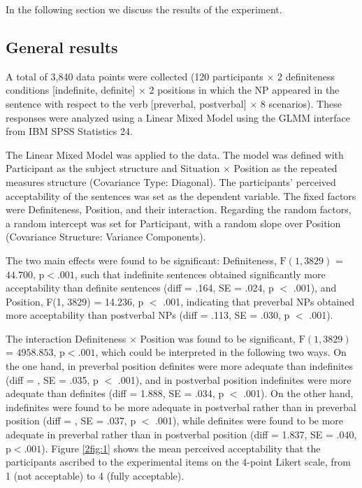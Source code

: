 \documentclass[output=paper]{langsci/langscibook}
\begin{document}
In the following section we discuss the results of the experiment.

\subsection{General results}\label{2sec:33}

A total of 3,840 data points were collected (120 participants $\times$ 2 definiteness conditions [indefinite, definite] $\times$ 2 positions in which the NP appeared in the sentence with respect to the verb [preverbal, postverbal] $\times$ 8 scenarios). These responses were analyzed using a Linear Mixed Model using the GLMM interface from IBM SPSS Statistics 24.

The Linear Mixed Model was applied to the data. The model was defined with Participant as the subject structure and Situation $\times$ Position as the repeated measures structure (Covariance Type: Diagonal). The participants' perceived acceptability of the sentences was set as the dependent variable. The fixed factors were Definiteness, Position, and their interaction. Regarding the random factors, a random intercept was set for Participant, with a random slope over Position (Covariance Structure: Variance Components).

The two main effects were found to be significant: Definiteness, $\text{F}(1, 3829)$ = $44.700$, $\text{p} < .001$, such that indefinite sentences obtained significantly more acceptability than definite sentences (diff = .164, SE = .024, p $<$ .001), and Position, F(1, 3829) = 14.236, p $<$ .001, indicating that preverbal NPs obtained more acceptability than postverbal NPs (diff = .113, SE = .030, p $<$ .001).

{
The interaction Definiteness $\times$ Position was found to be significant, $\text{F}(1, 3829)$ = $4958.853$, $\text{p} < .001$, which could be interpreted in the following two ways. On the one hand, in preverbal position definites were more adequate than indefinites (diff = , SE = .035, p $<$ .001), and in postverbal position indefinites were more adequate than definites (diff = 1.888, SE = .034, p $<$ .001). On the other hand, indefinites were found to be more adequate in postverbal rather than in preverbal position (diff = , SE = .037, p $<$ .001), while definites were found to be more adequate in preverbal rather than in postverbal position (diff = 1.837, SE = .040, $\text{p} < .001$). Figure \ref{2fig:1} shows the mean perceived acceptability that the participants ascribed to the experimental items on the 4-point Likert scale, from 1 (not acceptable) to 4 (fully acceptable).
}
\end{document}
